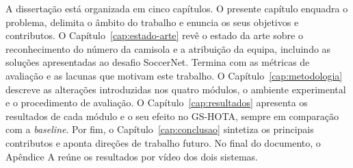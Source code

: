A dissertação está organizada em cinco capítulos. O presente capítulo enquadra o problema, delimita o âmbito do trabalho e enuncia os seus objetivos e contributos. O Capítulo~\ref{cap:estado-arte} revê o estado da arte sobre o reconhecimento do número da camisola e a atribuição da equipa, incluindo as soluções apresentadas ao desafio SoccerNet. Termina com as métricas de avaliação e as lacunas que motivam este trabalho. O Capítulo~\ref{cap:metodologia} descreve as alterações introduzidas nos quatro módulos, o ambiente experimental e o procedimento de avaliação. O Capítulo~\ref{cap:resultados} apresenta os resultados de cada módulo e o seu efeito no GS-HOTA, sempre em comparação com a \emph{baseline}. Por fim, o Capítulo~\ref{cap:conclusao} sintetiza os principais contributos e aponta direções de trabalho futuro. No final do documento, o Apêndice A reúne os resultados por vídeo dos dois sistemas.

